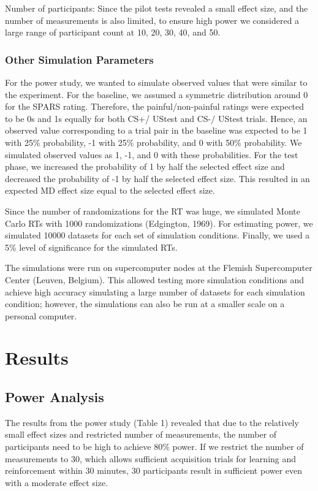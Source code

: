 \documentclass{article}
\begin{document}
Number of participants: Since the pilot tests revealed a small effect size, and the number of measurements is also limited, to ensure high power we considered a large range of participant count at 10, 20, 30, 40, and 50. 

\subsubsection{Other Simulation Parameters}

For the power study, we wanted to simulate observed values that were similar to the experiment. For the baseline, we assumed a symmetric distribution around 0 for the SPARS rating. Therefore, the painful/non-painful ratings were expected to be 0s and 1s equally for both CS+/ UStest and CS-/ UStest trials. Hence, an observed value corresponding to a trial pair in the baseline was expected to be 1 with 25\% probability, -1 with 25\% probability, and 0 with 50\% probability. We simulated observed values as 1, -1, and 0 with these probabilities. For the test phase, we increased the probability of 1 by half the selected effect size and decreased the probability of -1 by half the selected effect size. This resulted in an expected MD effect size equal to the selected effect size. 

Since the number of randomizations for the RT was huge, we simulated Monte Carlo RTs with 1000 randomizations (Edgington, 1969). For estimating power, we simulated 10000 datasets for each set of simulation conditions. Finally, we used a 5\% level of significance for the simulated RTs.

The simulations were run on supercomputer nodes at the Flemish Supercomputer Center (Leuven, Belgium). This allowed testing more simulation conditions and achieve high accuracy simulating a large number of datasets for each simulation condition; however, the simulations can also be run at a smaller scale on a personal computer. 

\section{Results}

\subsection{Power Analysis}

The results from the power study (Table 1) revealed that due to the relatively small effect sizes and restricted number of measurements, the number of participants need to be high to achieve 80\% power. If we restrict the number of measurements to 30, which allows sufficient acquisition trials for learning and reinforcement within 30 minutes, 30 participants result in sufficient power even with a moderate effect size. 
\end{document}
